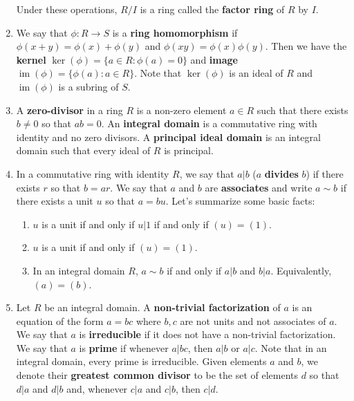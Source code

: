 \documentclass[12pt, a4paper]{article}
\DeclareMathOperator{\im}{im}
\theoremstyle{nonumberplain}
\begin{document}
\begin{enumerate}[nolistsep]
        Under these operations, $R/I$ is a ring called the \textbf{factor ring} of $R$ by $I$.
    \item We say that $\phi:R\to S$ is a \textbf{ring homomorphism} if $\phi(x+y)=\phi(x)+\phi(y)$ and $\phi(xy)=\phi(x)\phi(y)$.
        Then we have the \textbf{kernel} $\ker(\phi)=\{a\in R:\phi(a)=0\}$ and \textbf{image} $\im(\phi)=\{\phi(a):a\in R\}$.
        Note that $\ker(\phi)$ is an ideal of $R$ and $\im(\phi)$ is a subring of $S$.
    \item A \textbf{zero-divisor} in a ring $R$ is a non-zero element $a\in R$ such that there exists $b\neq 0$ so that $ab=0$.
        An \textbf{integral domain} is a commutative ring with identity and no zero divisors.
        A \textbf{principal ideal domain} is an integral domain such that every ideal of $R$ is principal.
    \item In a commutative ring with identity  $R$, we say that $a|b$ ($a$ \textbf{divides} $b$) if there exists $r$ so that $b=ar$.
        We say that $a$ and $b$ are \textbf{associates} and write $a\sim b$ if there exists a unit $u$ so that $a=bu$.
        Let's summarize some basic facts:
        \begin{enumerate}[nolistsep]
            \item $u$ is a unit if and only if $u|1$ if and only if $(u)=(1)$.
            \item $u$ is a unit if and only if $(u)=(1)$.
            \item In an integral domain $R$, $a\sim b$ if and only if $a|b$ and $b|a$.
                Equivalently, $(a)=(b)$.
        \end{enumerate}
    \item Let $R$ be an integral domain.
        A \textbf{non-trivial factorization} of $a$ is an equation of the form $a=bc$ where $b,c$ are not units and not associates of $a$.
        We say that $a$ is \textbf{irreducible} if it does not have a non-trivial factorization.
        We say that $a$ is \textbf{prime} if whenever $a|bc$, then $a|b$ or $a|c$.
        Note that in an integral domain, every prime is irreducible.
        Given elements $a$ and $b$, we denote their \textbf{greatest common divisor} to be the set of elements $d$ so that $d|a$ and $d|b$ and, whenever $c|a$ and $c|b$, then $c|d$.
\end{enumerate}
\end{document}
